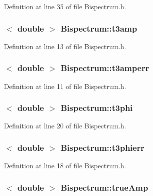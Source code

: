 Definition at line 35 of file Bispectrum.h.

\hypertarget{classBispectrum_a4f353f039c28e9a954b35efeee88803a}{
\subsubsection[{t3amp}]{$<$ double $>$ {\bf Bispectrum::t3amp}}}
\label{classBispectrum_a4f353f039c28e9a954b35efeee88803a}


Definition at line 13 of file Bispectrum.h.

\hypertarget{classBispectrum_acfb791e23ce2fe5a0d3207d600f5fced}{
\subsubsection[{t3amperr}]{$<$ double $>$ {\bf Bispectrum::t3amperr}}}
\label{classBispectrum_acfb791e23ce2fe5a0d3207d600f5fced}


Definition at line 11 of file Bispectrum.h.

\hypertarget{classBispectrum_afb0c6a5e00123a0816cdaf3f5cf99fb2}{
\subsubsection[{t3phi}]{$<$ double $>$ {\bf Bispectrum::t3phi}}}
\label{classBispectrum_afb0c6a5e00123a0816cdaf3f5cf99fb2}


Definition at line 20 of file Bispectrum.h.

\hypertarget{classBispectrum_acbda066ba007c56246f1a7dc0040e8a4}{
\subsubsection[{t3phierr}]{$<$ double $>$ {\bf Bispectrum::t3phierr}}}
\label{classBispectrum_acbda066ba007c56246f1a7dc0040e8a4}


Definition at line 18 of file Bispectrum.h.

\hypertarget{classBispectrum_a85904846b909567890fb1395b9fcb27b}{
\subsubsection[{trueAmp}]{$<$ double $>$ {\bf Bispectrum::trueAmp}}}
\label{classBispectrum_a85904846b909567890fb1395b9fcb27b}


